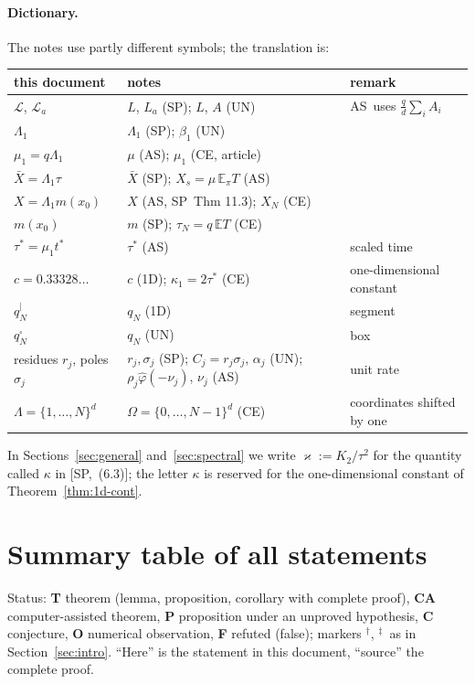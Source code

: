 \documentclass[10pt,a4paper]{article}
\theoremstyle{plain}
\theoremstyle{definition}
\newcommand{\NEW}{\ensuremath{^{\dagger}}}       %
\newcommand{\SYN}{\ensuremath{^{\ddagger}}}      %
\newcommand{\src}[2]{[\textsf{#1},~#2]}           %
\newcommand{\ONE}{\textsf{1D}}
\newcommand{\SPE}{\textsf{SP}}
\newcommand{\ASY}{\textsf{AS}}
\newcommand{\UNI}{\textsf{UN}}
\newcommand{\CER}{\textsf{CE}}
\newcommand{\E}{\mathbb{E}}
\newcommand{\Lg}{\mathcal{L}}
\newcommand{\Xb}{\bar X}
\newcommand{\qbox}{q^{\square}_N}
\newcommand{\qseg}{q^{|}_N}
\begin{document}
\paragraph{Dictionary.} The notes use partly different symbols; the translation is:
\begin{center}\small
\begin{tabular}{lll}
\toprule
this document & notes & remark\\
\midrule
$\Lg$, $\Lg_a$ & $L$, $L_a$ (\SPE); $L$, $A$ (\UNI) & \ASY\ uses $\frac qd\sum_iA_i$\\
$\Lambda_1$ & $\Lambda_1$ (\SPE); $\beta_1$ (\UNI) & \\
$\mu_1=q\Lambda_1$ & $\mu$ (\ASY); $\mu_1$ (\CER, article) & \\
$\Xb=\Lambda_1\tau$ & $\Xb$ (\SPE); $X_s=\mu\,\E_\pi T$ (\ASY) & \\
$X=\Lambda_1m(x_0)$ & $X$ (\ASY, \SPE\ Thm 11.3); $X_N$ (\CER) & \\
$m(x_0)$ & $m$ (\SPE); $\tau_N=q\,\E T$ (\CER) & \\
$\tau^*=\mu_1t^*$ & $\tau^*$ (\ASY) & scaled time\\
$c=0.33328\ldots$ & $c$ (\ONE); $\kappa_1=2\tau^*$ (\CER) & one-dimensional constant\\
$\qseg$ & $q_N$ (\ONE) & segment\\
$\qbox$ & $q_N$ (\UNI) & box\\
residues $r_j$, poles $\sigma_j$ & $r_j,\sigma_j$ (\SPE); $C_j=r_j\sigma_j$, $\alpha_j$ (\UNI); $\rho_j\hat\varphi(-\nu_j)$, $\nu_j$ (\ASY) & unit rate\\
$\Lambda=\{1,\dots,N\}^d$ & $\Omega=\{0,\dots,N-1\}^d$ (\CER) & coordinates shifted by one\\
\bottomrule
\end{tabular}
\end{center}
In Sections~\ref{sec:general} and~\ref{sec:spectral} we write $\varkappa:=K_2/\tau^2$ for the quantity called $\kappa$ in \src{\SPE}{(6.3)}; the letter $\kappa$ is reserved for the one-dimensional constant of Theorem~\ref{thm:1d-cont}.

\section{Summary table of all statements}\label{sec:summary}

Status: \textbf{T} theorem (lemma, proposition, corollary with complete proof), \textbf{CA} computer-assisted theorem, \textbf{P} proposition under an unproved hypothesis, \textbf{C} conjecture, \textbf{O} numerical observation, \textbf{F} refuted (false); markers \NEW, \SYN\ as in Section~\ref{sec:intro}. ``Here'' is the statement in this document, ``source'' the complete proof.
\end{document}
